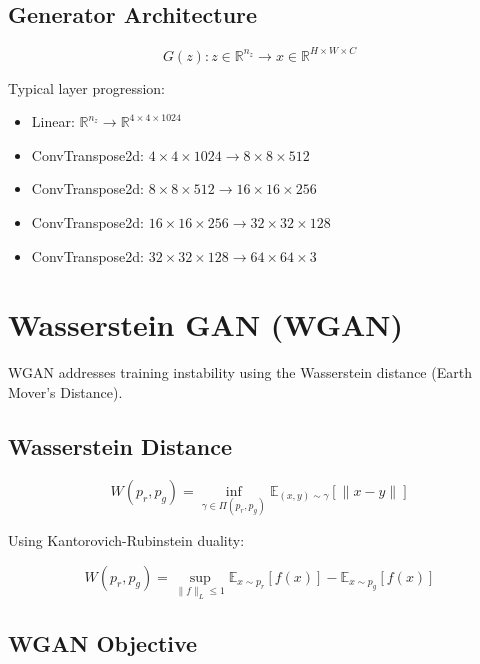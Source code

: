 \documentclass[12pt,a4paper]{article}
\begin{document}
\subsection{Generator Architecture}

\begin{equation}
G(z): z \in \mathbb{R}^{n_z} \rightarrow x \in \mathbb{R}^{H \times W \times C}
\end{equation}

Typical layer progression:
\begin{itemize}
    \item Linear: $\mathbb{R}^{n_z} \rightarrow \mathbb{R}^{4 \times 4 \times 1024}$
    \item ConvTranspose2d: $4 \times 4 \times 1024 \rightarrow 8 \times 8 \times 512$
    \item ConvTranspose2d: $8 \times 8 \times 512 \rightarrow 16 \times 16 \times 256$
    \item ConvTranspose2d: $16 \times 16 \times 256 \rightarrow 32 \times 32 \times 128$
    \item ConvTranspose2d: $32 \times 32 \times 128 \rightarrow 64 \times 64 \times 3$
\end{itemize}

\section{Wasserstein GAN (WGAN)}

WGAN addresses training instability using the Wasserstein distance (Earth Mover's Distance).

\subsection{Wasserstein Distance}

\begin{equation}
W(p_r, p_g) = \inf_{\gamma \in \Pi(p_r, p_g)} \mathbb{E}_{(x, y) \sim \gamma}[\|x - y\|]
\end{equation}

Using Kantorovich-Rubinstein duality:

\begin{equation}
W(p_r, p_g) = \sup_{\|f\|_L \leq 1} \mathbb{E}_{x \sim p_r}[f(x)] - \mathbb{E}_{x \sim p_g}[f(x)]
\end{equation}

\subsection{WGAN Objective}
\end{document}
